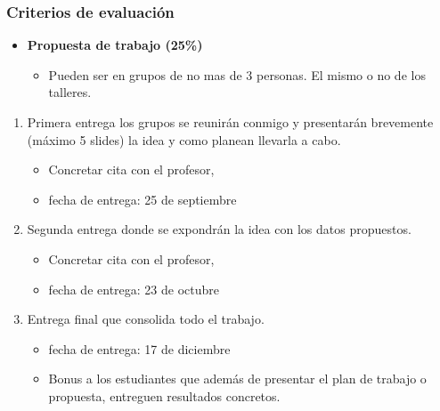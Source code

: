 \documentclass[
  shownotes,
  xcolor={svgnames},
  hyperref={colorlinks,citecolor=DarkBlue,linkcolor=DarkRed,urlcolor=DarkBlue}
  ]{beamer}
\begin{document}
\begin{frame}
\frametitle{Criterios de evaluación}
\begin{itemize}

  \item {\bf Propuesta de trabajo  (25\%)}
  \begin{itemize}
  \item Pueden ser en grupos de no mas de 3 personas. El mismo o no de los talleres.
  \end{itemize}
  \end{itemize}
     \bigskip
  \begin{enumerate}
      
      \item Primera entrega los grupos se reunirán conmigo y presentarán brevemente (máximo 5 slides) la idea y como planean llevarla a cabo.
      \begin{itemize}
        \item Concretar cita con el profesor,
        \item fecha de entrega: 25 de septiembre
      \end{itemize}
  
     \bigskip
  \item  Segunda entrega donde se expondrán la idea con los datos propuestos.
      \begin{itemize}
        \item Concretar cita con el profesor, 
        \item fecha de entrega: 23 de octubre
      \end{itemize}
      \bigskip
    \item  Entrega final que consolida todo el trabajo.
      \begin{itemize}
        \item fecha de entrega:  17 de diciembre
        \item Bonus a los estudiantes que además de presentar el plan de trabajo o propuesta, entreguen resultados concretos.
      \end{itemize}
\end{enumerate}






\end{frame}
\end{document}
